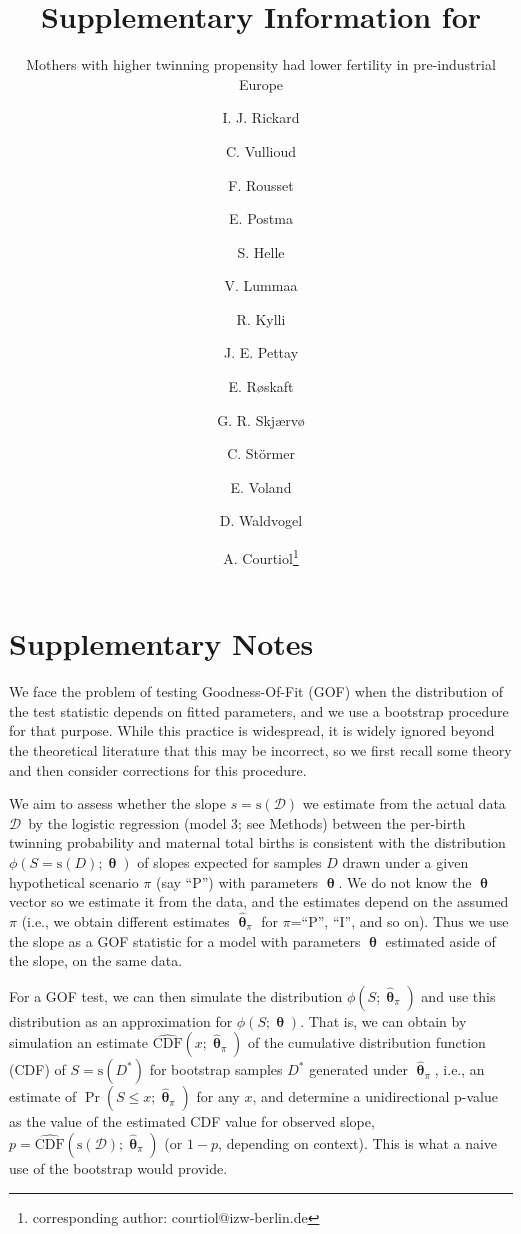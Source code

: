 \documentclass[a4paper]{article}\usepackage[]{graphicx}\usepackage[]{color}
\title{Supplementary Information for}
\subtitle{Mothers with higher twinning propensity had lower fertility in pre-industrial Europe}
\author{I. J. Rickard \and C. Vullioud \and F. Rousset \and E. Postma \and S.
Helle \and V. Lummaa \and R. Kylli \and J. E. Pettay \and E.
Røskaft \and G. R. Skjærvø \and C. Störmer \and E. Voland \and D.
Waldvogel \and A. Courtiol\footnote{corresponding author: courtiol@izw-berlin.de}}
\date{}
\newcommand{\adata}{\ensuremath{\mathcal{D}}}
\newcommand{\data}{\ensuremath{D}}
\newcommand{\CDF}{\ensuremath{\mathrm{CDF}}}
\newcommand{\sfn}{\ensuremath{\mathrm{s}}}
\newcommand{\bth}{\ensuremath{\bm{\uptheta}}}
\begin{document}
\renewcommand{\thetable}{S\arabic{table}}
\renewcommand{\thefigure}{S\arabic{figure}}



\maketitle

\tableofcontents





\newpage

\section{Supplementary Notes}

We face the problem of testing Goodness-Of-Fit (GOF) when the distribution of the test statistic depends on fitted parameters, and we use a bootstrap procedure for that purpose. While this practice is widespread, it is widely ignored beyond the theoretical literature that this may be incorrect, so we first recall some theory and then consider corrections for this procedure.

We aim to assess whether the slope $s=\sfn(\adata)$ we estimate from the actual data \adata\ by the logistic regression (model 3; see Methods) between the per-birth twinning probability and maternal total births is consistent with the distribution $\phi(S=\sfn(\data) ; \bth)$ of slopes expected for samples $\data$ drawn under a given hypothetical scenario $\pi$ (say ``P'') with parameters $\bth$. We do not know the $\bth$ vector so we estimate it from the data, and the estimates  depend on the assumed $\pi$ (i.e., we obtain different estimates $\hat{\bth}_\pi$ for $\pi$=``P'', ``I'', and so on). Thus we use the slope as a GOF statistic for a model with parameters $\bth$ estimated aside of the slope, on the same data.

For a GOF test, we can then simulate the distribution $\phi(S;\hat{\bth}_\pi)$ and use this distribution as an approximation for $\phi(S; \bth)$. That is, we can obtain by simulation an estimate $\hat{\CDF}(x;\hat{\bth}_\pi)$ of the cumulative distribution function (CDF) of $S=\sfn(\data^*)$ for bootstrap samples $\data^*$ generated under $\hat{\bth}_\pi$, i.e., an estimate of $\Pr(S\leq x; \hat{\bth}_\pi)$ for any $x$, and determine a unidirectional p-value as the value of the estimated CDF value for observed slope, $p=\hat{\CDF}(\sfn(\adata) ;\hat{\bth}_\pi)$ (or $1-p$, depending on context). This is what a naive use of the bootstrap would provide.
\end{document}
